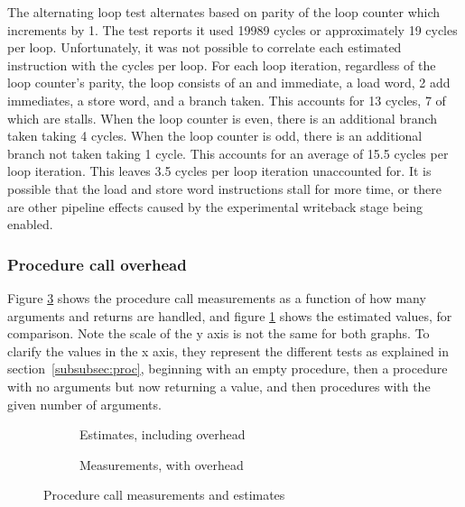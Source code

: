 \documentclass{article}
\begin{document}
The alternating loop test alternates based on parity of the loop counter which increments by 1. The test reports it used 19989 cycles or approximately 19 cycles per loop. Unfortunately, it was not possible to correlate each estimated instruction with the cycles per loop. For each loop iteration, regardless of the loop counter's parity, the loop consists of an and immediate, a load word, 2 add immediates, a store word, and a branch taken. This accounts for 13 cycles, 7 of which are stalls. When the loop counter is even, there is an additional branch taken taking 4 cycles. When the loop counter is odd, there is an additional branch not taken taking 1 cycle. This accounts for an average of 15.5 cycles per loop iteration. This leaves 3.5 cycles per loop iteration unaccounted for. It is possible that the load and store word instructions stall for more time, or there are other pipeline effects caused by the experimental writeback stage being enabled.


\subsubsection{Procedure call overhead}

Figure \ref{fig:proc} shows the procedure call measurements as a function of how many arguments and returns are handled, and figure \ref{fig:proc_est} shows the estimated values, for comparison. Note the scale of the y axis is not the same for both graphs. To clarify the values in the x axis, they represent the different tests as explained in section~\ref{subsubsec:proc}, beginning with an empty procedure, then a procedure with no arguments but now returning a value, and then procedures with the given number of arguments.

\begin{figure}[hp]
    \centering
    \begin{subfigure}[b]{1\textwidth}
        \centering
        
        \caption{Estimates, including overhead}
        \label{fig:proc_est}
    \end{subfigure}
    \begin{subfigure}[b]{1\textwidth}
        \centering
        
        \caption{Measurements, with overhead}
        \label{fig:proc}
    \end{subfigure}
    \caption{Procedure call measurements and estimates}
\end{figure}
\end{document}
